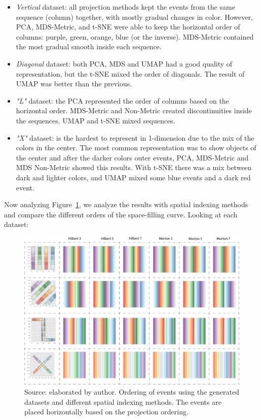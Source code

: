 \begin{itemize}
    \item \textit{Vertical} dataset: all projection methods kept the events from the same sequence (column) together, with mostly gradual changes in color. However, PCA, MDS-Metric, and t-SNE were able to keep the horizontal order of columns: purple, green, orange, blue (or the inverse). MDS-Metric contained the most gradual smooth inside each sequence.
    \item \textit{Diagonal} dataset: both PCA, MDS and UMAP had a good quality of representation, but the t-SNE mixed the order of diagonals. The result of UMAP was better than the previous.
    \item \textit{"L"} dataset: the PCA represented the order of columns based on the horizontal order. MDS-Metric and Non-Metric created discontinuities inside the sequences. UMAP and t-SNE mixed sequences.
    \item \textit{"X"} dataset: is the hardest to represent in 1-dimension due to the mix of the colors in the center.
    The most common representation was to show objects of the center and after the darker colors outer events, PCA, MDS-Metric and MDS Non-Metric showed this results.
    With t-SNE there was a mix between dark and lighter colors, and UMAP mixed some blue events and a dark red event.
\end{itemize}

Now analyzing Figure~\ref{fig:generated-datasets-spatial-indexing}, we analyze the results with spatial indexing methods and compare the different orders of the space-filling curve. Looking at each dataset:

\begin{figure}
    \centering
    \includegraphics[width = \textwidth]{src/imgs/generated-datasets-spatial-indexing.pdf}
    \caption{Source: elaborated by author. Ordering of events using the generated datasets and different spatial indexing methods. The events are placed horizontally based on the projection ordering.}
    \label{fig:generated-datasets-spatial-indexing}
\end{figure}

